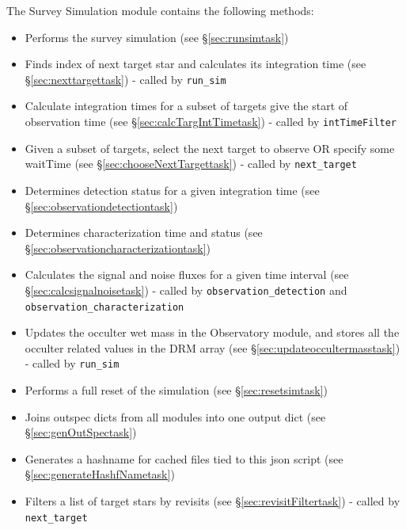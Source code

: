 \documentclass[cleanfoot]{asme2ej}
\newcommand{\reffig}[1]{Figure \ref{#1}}
\begin{document}
The Survey Simulation module contains the following methods:
\begin{itemize}[leftmargin=2.5in,font={\ttfamily}]
    \item[\texttt run\_sim] Performs the survey simulation (see \S\ref{sec:runsimtask})
    \item[\texttt next\_target] Finds index of next target star and calculates its integration time (see \S\ref{sec:nexttargettask}) - called by \verb+run_sim+
    \item[\texttt calc\_targ\_intTime] Calculate integration times for a subset of targets give the start of observation time (see \S\ref{sec:calcTargIntTimetask}) - called by \verb+intTimeFilter+
    \item[\texttt choose\_next\_target] Given a subset of targets, select the next target to observe OR specify some waitTime (see \S\ref{sec:chooseNextTargettask}) - called by \verb+next_target+
    \item[\texttt observation\_detection] Determines detection status for a given integration time  (see \S\ref{sec:observationdetectiontask})
    \item[\texttt observation\_characterization] Determines characterization time and status (see \S\ref{sec:observationcharacterizationtask})
    \item[\texttt calc\_signal\_noise] Calculates the signal and noise fluxes for a given time interval (see \S\ref{sec:calcsignalnoisetask}) - called by \verb+observation_detection+ and \verb+observation_characterization+
    \item[\texttt update\_occulter\_mass] Updates the occulter wet mass in the Observatory module, and stores all the occulter related values in the DRM array (see \S\ref{sec:updateoccultermasstask}) - called by \verb+run_sim+
    \item[\texttt reset\_sim] Performs a full reset of the simulation (see \S\ref{sec:resetsimtask})
    \item[\texttt genOutSpec] Joins outspec dicts from all modules into one output dict (see \S\ref{sec:genOutSpectask})
    \item[\texttt generateHashName] Generates a hashname for cached files tied to this json script (see \S\ref{sec:generateHashfNametask})
    \item[\texttt revisitFilter] Filters a list of target stars by revisits (see \S\ref{sec:revisitFiltertask}) - called by \verb+next_target+
\end{itemize}
\end{document}

